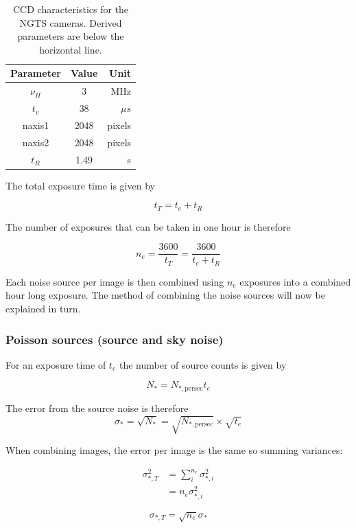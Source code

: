 \documentclass[11pt,a4paper]{report}
\begin{document}
\begin{table}
    \centering
    \begin{tabular}{ccr}
        \toprule
        Parameter & Value & Unit \\
        \midrule
        $\nu_H$ & $3$ & MHz \\
        $t_v$ & $38$ &  $\mu s$ \\
        naxis1 & 2048 & pixels \\
        naxis2 & 2048 & pixels \\
        \midrule
        $t_R$ & 1.49 & s \\
        \bottomrule
    \end{tabular}
    \caption{CCD characteristics for the NGTS cameras. Derived
    parameters are below the horizontal line.}
    \label{tab:ccdparams}
\end{table}

The total exposure time is given by 

\[
    t_T = t_e + t_R
    \]


The number of exposures that can be taken in one hour is therefore 

\[
    n_{e} = \frac{3600}{t_T} = \frac{3600}{t_e + t_R}
    \]

Each noise source per image is then combined using $n_e$ exposures into
a combined hour long exposure. The method of combining the  noise sources 
will now be explained in turn.

\subsubsection{Poisson sources (source and sky noise)}

For an exposure time of $t_e$ the number of source counts is given by

\[
    N_{\ast} = N_{\ast,\mathrm{per sec}} t_e
    \]

The error from the source noise is therefore
\[
    \sigma_{\ast} = \sqrt{N_{\ast}} = \sqrt{N_{\ast,\mathrm{per sec}}}
    \times \sqrt{t_e}
    \]

When combining images, the error per image is the same so summing
variances:

\begin{align*}
    \sigma_{\ast,T}^2 &= \sum_i^{n_{e}} \sigma_{\ast,i}^2 \\
        & = n_{e} \sigma_{\ast,i}^2
\end{align*}

\[
    \sigma_{\ast, T} = \sqrt{n_{e}} \sigma_{\ast}
    \]
\end{document}
